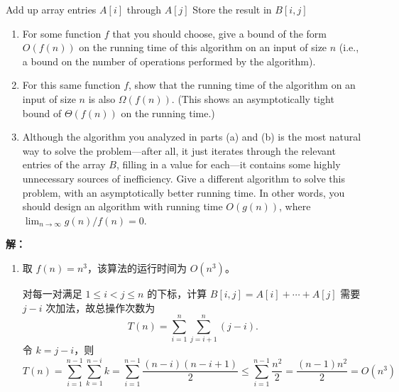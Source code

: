 \documentclass[12pt]{article}
\newenvironment{solution}{\par\noindent\textbf{解：}\par}{\par}
\begin{document}
\begin{enumerate}
    \medskip

    \begin{algorithmic}
            \State Add up array entries $A[i]$ through $A[j]$
            \State Store the result in $B[i, j]$
        \EndFor
    \EndFor
    \end{algorithmic}

    \medskip

    \begin{enumerate}
        \item For some function $f$ that you should choose, give a bound of the form $O(f(n))$ on the running time of this algorithm on an input of size $n$ (i.e., a bound on the number of operations performed by the algorithm).

        \item For this same function $f$, show that the running time of the algorithm on an input of size $n$ is also $\Omega(f(n))$. (This shows an asymptotically tight bound of $\Theta(f(n))$ on the running time.)

        \item Although the algorithm you analyzed in parts (a) and (b) is the most natural way to solve the problem---after all, it just iterates through the relevant entries of the array $B$, filling in a value for each---it contains some highly unnecessary sources of inefficiency. Give a different algorithm to solve this problem, with an asymptotically better running time. In other words, you should design an algorithm with running time $O(g(n))$, where $\lim_{n\to\infty} g(n)/f(n) = 0$.
    \end{enumerate}

    \begin{solution}

        \begin{enumerate}
            \item 取 $f(n) = n^3$，该算法的运行时间为 $O(n^3)$。

            对每一对满足 $1 \leq i < j \leq n$ 的下标，计算 $B[i,j] = A[i] + \cdots + A[j]$ 需要 $j - i$ 次加法，故总操作次数为
            $$
                T(n) = \sum_{i=1}^{n} \sum_{j=i+1}^{n} (j - i).
            $$
            令 $k = j - i$，则
            $$
                T(n) = \sum_{i=1}^{n-1} \sum_{k=1}^{n-i} k
                     = \sum_{i=1}^{n-1} \frac{(n-i)(n-i+1)}{2}
                     \leq \sum_{i=1}^{n-1} \frac{n^2}{2}
                     = \frac{(n-1)n^2}{2}
                     = O(n^3)
            $$


\end{enumerate}
\end{solution}
\end{enumerate}
\end{document}
